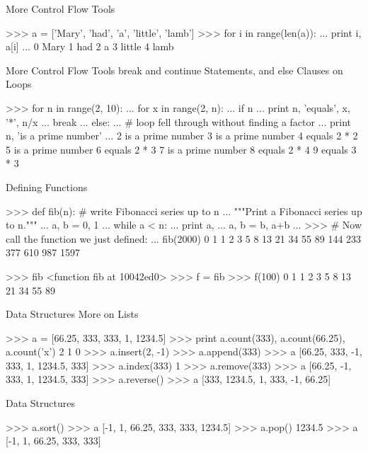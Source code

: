 \documentclass[11pt]{beamer}
\begin{document}
\begin{frame}[containsverbatim]{More Control Flow Tools}
\begin{python}
>>> a = ['Mary', 'had', 'a', 'little', 'lamb']
>>> for i in range(len(a)):
...    print i, a[i]
...
0 Mary
1 had
2 a
3 little
4 lamb
\end{python}
\end{frame}


\begin{frame}[containsverbatim]{More Control Flow Tools}
break and continue Statements, and else Clauses on Loops
\begin{python}
>>> for n in range(2, 10):
...    for x in range(2, n):
...        if n %
...            print n, 'equals', x, '*', n/x
...            break
...    else:
...        # loop fell through without finding a factor
...        print n, 'is a prime number'
...
2 is a prime number
3 is a prime number
4 equals 2 * 2
5 is a prime number
6 equals 2 * 3
7 is a prime number
8 equals 2 * 4
9 equals 3 * 3
\end{python}
\end{frame}


\begin{frame}[containsverbatim]{Defining Functions}
\begin{python}
>>> def fib(n):    # write Fibonacci series up to n
...    """Print a Fibonacci series up to n."""
...    a, b = 0, 1
...    while a < n:
...        print a,
...        a, b = b, a+b
...
>>> # Now call the function we just defined:
... fib(2000)
0 1 1 2 3 5 8 13 21 34 55 89 144 233 377 610 987 1597

>>> fib
<function fib at 10042ed0>
>>> f = fib
>>> f(100)
0 1 1 2 3 5 8 13 21 34 55 89
\end{python}
\end{frame}


\begin{frame}[containsverbatim]{Data Structures}
More on Lists
\begin{python}
>>> a = [66.25, 333, 333, 1, 1234.5]
>>> print a.count(333), a.count(66.25), a.count('x')
2 1 0
>>> a.insert(2, -1)
>>> a.append(333)
>>> a
[66.25, 333, -1, 333, 1, 1234.5, 333]
>>> a.index(333)
1
>>> a.remove(333)
>>> a
[66.25, -1, 333, 1, 1234.5, 333]
>>> a.reverse()
>>> a
[333, 1234.5, 1, 333, -1, 66.25]
\end{python}
\end{frame}


\begin{frame}[containsverbatim]{Data Structures}
\begin{python}
>>> a.sort()
>>> a
[-1, 1, 66.25, 333, 333, 1234.5]
>>> a.pop()
1234.5
>>> a
[-1, 1, 66.25, 333, 333]
\end{python}
\end{frame}
\end{document}
